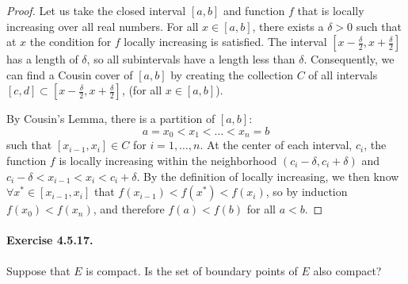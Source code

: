 \documentclass[11pt]{article}
\begin{document}

\def \ab {[a, b]}
\def \halfdelta {\frac{\delta}{2}}
\def \xneighborhood {[x - \halfdelta, x + \halfdelta]}
\def \xinterval {[\ximinusone, x_i]}
\def \ximinusone {x_{i-1}}
\def \ci {c_i}
\begin{proof}
	
	Let us take the closed interval $\ab$ and function $f$ that is locally increasing over all real numbers. For all $x \in \ab$, there exists a $\delta > 0$ such that at $x$ the condition for $f$ locally increasing is satisfied. The interval $\xneighborhood$ has a length of $\delta$, so all subintervals have a length less than $\delta$. Consequently, we can find a Cousin cover of $\ab$ by creating the collection $C$ of all intervals $[c, d] \subset [x - \halfdelta, x + \halfdelta]$, (for all $x \in \ab$). 
	
	By Cousin's Lemma, there is a partition of $\ab$: $$a = x_0 < x_1 < \dots < x_n = b$$ such that $[\ximinusone, x_i] \in C$ for $i = 1, \dots, n$. At the center of each interval, $\ci$, the function $f$ is locally increasing within the neighborhood $(\ci - \delta, \ci + \delta)$ and $\ci - \delta < \ximinusone < x_i < \ci + \delta$. By the definition of locally increasing, we then know $\forall x^* \in \xinterval$ that $f(\ximinusone) < f(x^*) < f(x_i)$, so by induction $f(x_0) < f(x_n)$, and therefore $f(a) < f(b)$ for all $a < b$.
\end{proof}

\def \bacc {B_{acc}}
\def \biso {B_{iso}}
\newtheorem{lemma4517}{Lemma}
\paragraph{Exercise 4.5.17.} Suppose that $E$ is compact. Is the set of boundary points of $E$ also compact? \newline
\end{document}
